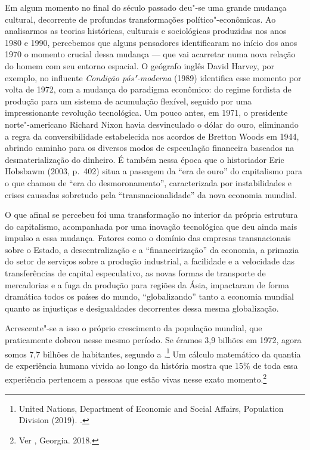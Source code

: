 Em algum momento no final do século passado deu"-se uma grande mudança
cultural, decorrente de profundas transformações político"-econômicas. Ao
analisarmos as teorias históricas, culturais e sociológicas produzidas
nos anos 1980 e 1990, percebemos que alguns pensadores identificaram no
início dos anos 1970 o momento crucial dessa mudança --- que vai
acarretar numa nova relação do homem com seu entorno espacial. O
geógrafo inglês David Harvey, por exemplo, no influente \emph{Condição
pós"-moderna} (1989) identifica esse momento por volta de 1972, com a
mudança do paradigma econômico: do regime fordista de produção para um
sistema de acumulação flexível, seguido por uma impressionante revolução
tecnológica. Um pouco antes, em 1971, o presidente norte"-americano
Richard Nixon havia desvinculado o dólar do ouro, eliminando a regra da
conversibilidade estabelecida nos acordos de Bretton Woods em 1944,
abrindo caminho para os diversos modos de especulação financeira
baseados na desmaterialização do dinheiro. É também nessa época que o
historiador Eric Hobsbawm (2003, p.~402) situa a passagem da ``era de ouro'' do
capitalismo para o que chamou de ``era do desmoronamento'',
caracterizada por instabilidades e crises causadas sobretudo pela
``transnacionalidade'' da nova economia mundial.

O que afinal se percebeu foi uma transformação no interior da própria
estrutura do capitalismo, acompanhada por uma inovação tecnológica que
deu ainda mais impulso a essa mudança. Fatores como o domínio das
empresas transnacionais sobre o Estado, a descentralização e a
``financeirização'' da economia, a primazia do setor de serviços sobre a
produção industrial, a facilidade e a velocidade das transferências de
capital especulativo, as novas formas de transporte de mercadorias e a
fuga da produção para regiões da Ásia, impactaram de forma dramática
todos os países do mundo, ``globalizando'' tanto a economia mundial
quanto as injustiças e desigualdades decorrentes dessa mesma
globalização.

Acrescente"-se a isso o próprio crescimento da população mundial, que
praticamente dobrou nesse mesmo período. Se éramos 3,9 bilhões em 1972, agora somos
7,7 bilhões de habitantes, segundo a .\footnote{United Nations,
  Department of Economic and Social Affairs, Population Division (2019).
  {}.} Um cálculo
matemático da quantia de experiência humana vivida ao longo da história
mostra que 15\% de toda essa experiência pertencem a pessoas que estão
vivas nesse exato momento.\footnote{Ver , Georgia. {} 2018.}

